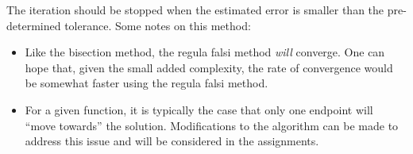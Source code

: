 The iteration should be stopped when the estimated error is smaller than the pre-determined tolerance.  Some notes on this method:
\begin{itemize}
\item Like the bisection method, the regula falsi method \emph{will} converge.  One can hope that, given the small added complexity, the rate of convergence would be somewhat faster using the regula falsi method.
\item For a given function, it is typically the case that only one endpoint will ``move towards'' the solution.  Modifications to the algorithm can be made to address this issue and will be considered in the assignments.
\end{itemize}
